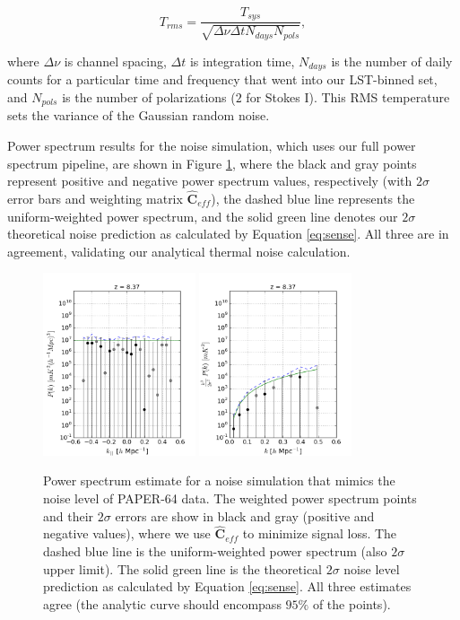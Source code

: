 \documentclass[preprint2,numberedappendix,tighten]{aastex6}  %
\begin{document}
\begin{equation}
\label{eq:noise}
T_{rms} = \frac{T_{sys}}{\sqrt{\Delta\nu \Delta t N_{days} N_{pols}}},
\end{equation}

\noindent where $\Delta\nu$ is channel spacing, $\Delta t$ is integration time, $N_{days}$ is the number of daily counts for a 
particular time and frequency that went into our LST-binned set, and $N_{pols}$ is the number of polarizations ($2$ for Stokes 
I). This RMS temperature sets the variance of the Gaussian random noise.

Power spectrum results for the noise simulation, which uses our full power spectrum pipeline, are shown in Figure 
\ref{fig:ps_noise}, where the black and gray points represent positive and negative power spectrum values, respectively (with 
$2\sigma$ error bars and weighting matrix $\widehat{\textbf{C}}_{eff}$), the dashed blue line represents the uniform-weighted power 
spectrum, and the solid green line denotes our $2\sigma$ theoretical noise prediction as calculated by Equation 
\eqref{eq:sense}. All three are in agreement, validating our analytical thermal noise calculation. 

\begin{figure}
	\centering
	\includegraphics[width=0.4\textwidth]{plots/ps1_noise_add.png}
	\includegraphics[width=0.4\textwidth]{plots/ps2_noise_add.png}
	\caption{Power spectrum estimate for a noise simulation that mimics the noise level of PAPER-64 data. The weighted 
power spectrum points and their $2\sigma$ errors are show in black and gray (positive and negative values), where we use $
\widehat{\textbf{C}}_{eff}$ to minimize signal loss. The dashed blue line is the uniform-weighted power spectrum (also $2\sigma$ upper 
limit). The solid green line is the theoretical $2\sigma$ noise level prediction as calculated by Equation \eqref{eq:sense}. All three 
estimates agree (the analytic curve should encompass $95\%$ of the points).}
	\label{fig:ps_noise}
\end{figure}
\end{document}
